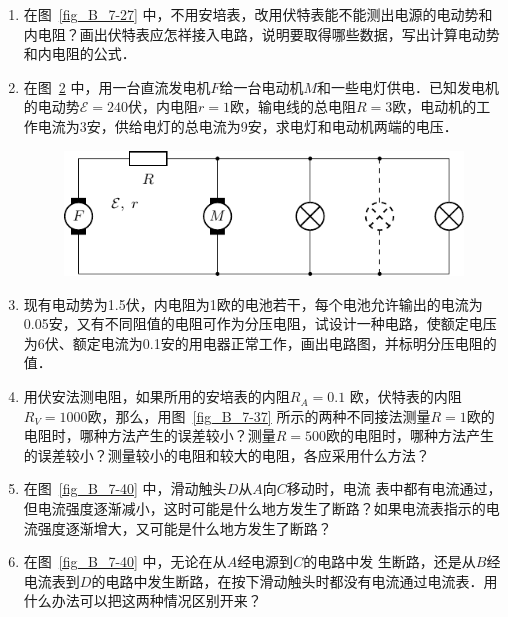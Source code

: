 \begin{enumerate}
\begin{figure}[htbp]
\begin{minipage}[t]{0.48\textwidth}
        \caption{}\label{fig_B_7-44}
    \end{minipage}
\end{figure}
\item 在图~\ref{fig_B_7-27} 中，不用安培表，改用伏特表能不能测出电源的电动势和内电阻？画出伏特表应怎祥接入电路，说明要取得哪些数据，写出计算电动势和内电阻的公式．
\item 在图~\ref{fig_B_7-45} 中，用一台直流发电机$F$给一台电动机$M$和一些电灯供电．已知发电机的电动势$\mathcal{E}=240$伏，内电阻$r=1$欧，输电线的总电阻$R=3$欧，电动机的工作电流为3安，供给电灯的总电流为9安，求电灯和电动机两端的电压．
\begin{figure}[htbp]
    \centering
    \includegraphics{fig/B/7-45.pdf}
    \caption{}\label{fig_B_7-45}
\end{figure}

\item 现有电动势为1.5伏，内电阻为1欧的电池若干，每个电池允许输出的电流为0.05安，又有不同阻值的电阻可作为分压电阻，试设计一种电路，使额定电压为6伏、额定电流为0.1安的用电器正常工作，画出电路图，并标明分压电阻的值．
\item 用伏安法测电阻，如果所用的安培表的内阻$R_A=0.1$
欧，伏特表的内阻$R_V=1000$欧，那么，用图~\ref{fig_B_7-37} 所示的两种不同接法测量$R=1$欧的电阻时，哪种方法产生的误差较小？测量$R=500$欧的电阻时，哪种方法产生的误差较小？测量较小的电阻和较大的电阻，各应采用什么方法？
\item 在图~\ref{fig_B_7-40} 中，滑动触头$D$从$A$向$C$移动时，电流
表中都有电流通过，但电流强度逐渐减小，这时可能是什么地方发生了断路？如果电流表指示的电流强度逐渐增大，又可能是什么地方发生了断路？
\item 在图~\ref{fig_B_7-40} 中，无论在从$A$经电源到$C$的电路中发
生断路，还是从$B$经电流表到$D$的电路中发生断路，在按下滑动触头时都没有电流通过电流表．用什么办法可以把这两种情况区别开来？
\end{enumerate}






